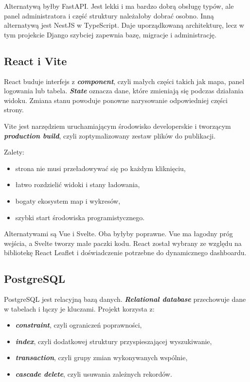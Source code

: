 \documentclass[14pt,a5paper,oneside]{extarticle}
\newcommand{\term}[1]{\textbf{\textit{#1}}}
\begin{document}
Alternatywą byłby FastAPI. Jest lekki i ma bardzo dobrą obsługę typów, ale
panel administratora i część struktury należałoby dobrać osobno. Inną
alternatywą jest NestJS w TypeScript. Daje uporządkowaną architekturę, lecz
w tym projekcie Django szybciej zapewnia bazę, migracje i administrację.

\subsection{React i Vite}

React buduje interfejs z \term{component}, czyli małych części takich jak
mapa, panel logowania lub tabela. \term{State} oznacza dane, które zmieniają
się podczas działania widoku. Zmiana stanu powoduje ponowne narysowanie
odpowiedniej części strony.

Vite jest narzędziem uruchamiającym środowisko developerskie i tworzącym
\term{production build}, czyli zoptymalizowany zestaw plików do publikacji.

Zalety:

\begin{itemize}
  \item strona nie musi przeładowywać się po każdym kliknięciu,
  \item łatwo rozdzielić widoki i stany ładowania,
  \item bogaty ekosystem map i wykresów,
  \item szybki start środowiska programistycznego.
\end{itemize}

Alternatywami są Vue i Svelte. Oba byłyby poprawne. Vue ma łagodny próg
wejścia, a Svelte tworzy małe paczki kodu. React został wybrany ze względu
na bibliotekę React Leaflet i doświadczenie potrzebne do dynamicznego
dashboardu.

\subsection{PostgreSQL}

PostgreSQL jest relacyjną bazą danych. \term{Relational database} przechowuje
dane w tabelach i łączy je kluczami. Projekt korzysta z:

\begin{itemize}
  \item \term{constraint}, czyli ograniczeń poprawności,
  \item \term{index}, czyli dodatkowej struktury przyspieszającej wyszukiwanie,
  \item \term{transaction}, czyli grupy zmian wykonywanych wspólnie,
  \item \term{cascade delete}, czyli usuwania zależnych rekordów.
\end{itemize}
\end{document}
